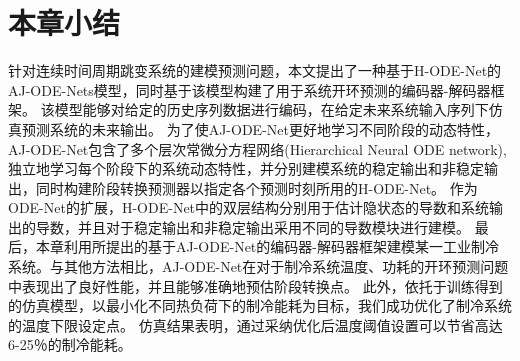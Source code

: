 \section{本章小结}
\label{sec:conclusion}
针对连续时间周期跳变系统的建模预测问题，本文提出了一种基于H-ODE-Net的AJ-ODE-Nets模型，同时基于该模型构建了用于系统开环预测的编码器-解码器框架。
该模型能够对给定的历史序列数据进行编码，在给定未来系统输入序列下仿真预测系统的未来输出。
为了使AJ-ODE-Net更好地学习不同阶段的动态特性，AJ-ODE-Net包含了多个层次常微分方程网络(Hierarchical Neural ODE network), 独立地学习每个阶段下的系统动态特性，并分别建模系统的稳定输出和非稳定输出，同时构建阶段转换预测器以指定各个预测时刻所用的H-ODE-Net。
作为ODE-Net的扩展，H-ODE-Net中的双层结构分别用于估计隐状态的导数和系统输出的导数，并且对于稳定输出和非稳定输出采用不同的导数模块进行建模。
最后，本章利用所提出的基于AJ-ODE-Net的编码器-解码器框架建模某一工业制冷系统。与其他方法相比，AJ-ODE-Net在对于制冷系统温度、功耗的开环预测问题中表现出了良好性能，并且能够准确地预估阶段转换点。
此外，依托于训练得到的仿真模型，以最小化不同热负荷下的制冷能耗为目标，我们成功优化了制冷系统的温度下限设定点。
仿真结果表明，通过采纳优化后温度阈值设置可以节省高达6-25％的制冷能耗。







